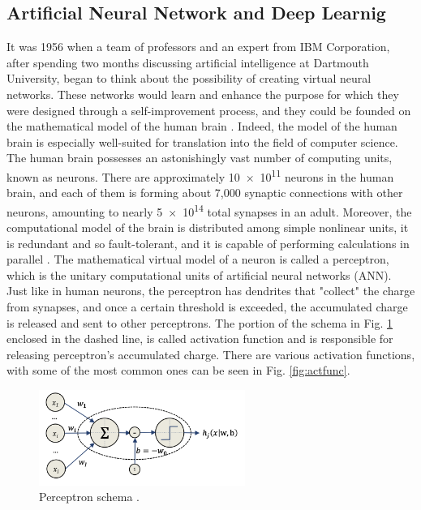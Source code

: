 

\subsection{Artificial Neural Network and Deep Learnig}
\label{subsec:deepl}
It was 1956 when a team of professors and an expert from IBM Corporation, after spending two months discussing artificial intelligence at Dartmouth University, began to think about the possibility of creating virtual neural networks. These networks would learn and enhance the purpose for which they were designed through a self-improvement process, and they could be founded on the mathematical model of the human brain \cite{mccarthy_proposal_1955}. Indeed, the model of the human brain is especially well-suited for translation into the field of computer science. The human brain possesses an astonishingly vast number of computing units, known as neurons. There are approximately \num{10e11} neurons in the human brain, and each of them is forming about 7,000 synaptic connections with other neurons, amounting to nearly \num{5e14} total synapses in an adult. Moreover, the computational model of the brain is distributed among simple nonlinear units, it is redundant and so fault-tolerant, and it is capable of performing calculations in parallel \cite{matteo_matteucci_perceptrons_2021}. The mathematical virtual model of a neuron is called a perceptron, which is the unitary computational units of artificial neural networks (ANN). Just like in human neurons, the perceptron has dendrites that "collect" the charge from synapses, and once a certain threshold is exceeded, the accumulated charge is released and sent to other perceptrons. The portion of the schema in Fig. \ref{fig:perceptron} enclosed in the dashed line, is called activation function and is responsible for releasing perceptron's accumulated charge. There are various activation functions, with some of the most common ones can be seen in Fig. \ref{fig:actfunc}.
\begin{figure}
    \centering
    \includegraphics[width=0.6\textwidth]{Images/neurone.png}
    \caption[Perceptron schema]{Perceptron schema \cite{matteo_matteucci_perceptrons_2021}.}
    \label{fig:perceptron}
\end{figure}
